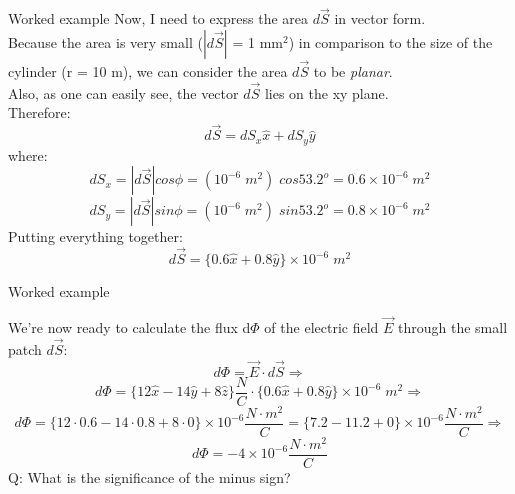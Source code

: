 {\begin{frame}{Worked example}
Now, I need to express the area $d\vec{S}$ in vector form.\\
\vspace{0.2cm}
Because the area is very small ($|d\vec{S}|$ = 1 mm$^2$) in comparison to the
size of the cylinder (r = 10 m), we can consider the area $d\vec{S}$ to be {\em planar}.\\
\vspace{0.1cm}
Also, as one can easily see, the vector $d\vec{S}$ lies on the xy plane.\\
\vspace{0.3cm}
Therefore:
\begin{equation*}
  d\vec{S} = dS_x \hat{x} + dS_y \hat{y}
\end{equation*}
where:
\begin{equation*}
   dS_x = |d\vec{S}| cos\phi = (10^{-6} \; m^2) \; cos53.2^o = 0.6 \times 10^{-6} \; m^2
\end{equation*}
\begin{equation*}
   dS_y = |d\vec{S}| sin\phi = (10^{-6} \; m^2) \; sin53.2^o = 0.8 \times 10^{-6} \; m^2
\end{equation*}
\vspace{0.2cm}
Putting everything together:
\begin{equation*}
  d\vec{S} = \big\{ 0.6 \hat{x} + 0.8 \hat{y} \big\} \times 10^{-6} \; m^2
\end{equation*}

\end{frame}

%
%
%

\begin{frame}{Worked example}

We're now ready to calculate the flux d$\Phi$ of the electric field $\vec{E}$
through the small patch $d\vec{S}$:\\
\vspace{0.2cm}
\begin{equation*}
  d\Phi = \vec{E} \cdot d\vec{S} \Rightarrow
\end{equation*}
\vspace{0.1cm}
\begin{equation*}
  d\Phi =
  \big\{ 12 \hat{x} - 14 \hat{y} + 8 \hat{z} \big\} \frac{N}{C}
   \cdot \big\{ 0.6 \hat{x} + 0.8 \hat{y} \big\} \times 10^{-6} \; m^2 \Rightarrow
\end{equation*}
\vspace{0.1cm}
\begin{equation*}
  d\Phi =
  \big\{ 12 \cdot 0.6 - 14 \cdot 0.8 + 8 \cdot 0 \big\} \times 10^{-6} \frac{N \cdot m^2}{C} =
  \big\{ 7.2 - 11.2 + 0 \big\} \times 10^{-6} \frac{N \cdot m^2}{C}
  \Rightarrow
\end{equation*}
\vspace{0.1cm}
\begin{equation*}
  d\Phi = -4 \times 10^{-6} \frac{N \cdot m^2}{C}
\end{equation*}
\vspace{0.1cm}
Q: What is the significance of the minus sign?
\end{frame}


} %



